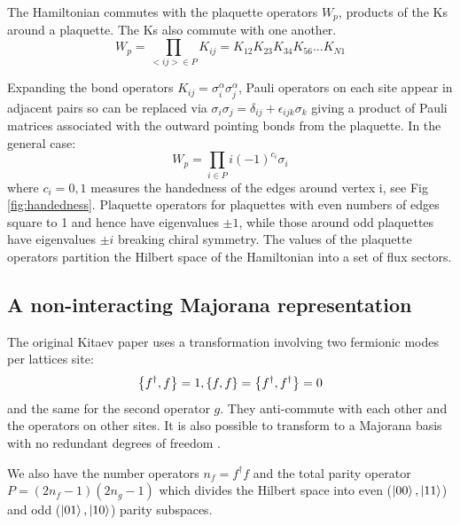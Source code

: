 The Hamiltonian commutes with the plaquette operators \(W_p\), products of the Ks around a plaquette. The Ks also commute with one another.
\[W_p = \prod_{<ij> \in P} K_{ij} = K_{12}K_{23}K_{34}K_{56} ... K_{N1}\]

Expanding the bond operators \(K_{ij} = \sigma_i^{\alpha} \sigma_j^{\alpha}\), Pauli operators on each site appear in adjacent pairs so can be replaced via \(\sigma_i \sigma_j = \delta_{ij} + \epsilon_{ijk} \sigma_k\) giving a product of Pauli matrices associated with the outward pointing bonds from the plaquette. In the general case:
\[W_p = \prod_{i \in P} i (-1)^{c_i} \sigma_i\]
where \(c_i = 0,1\) measures the handedness of the edges around vertex i, see Fig \ref{fig:handedness}. Plaquette operators for plaquettes with even numbers of edges square to 1 and hence have eigenvalues \(\pm 1\), while those around odd plaquettes have eigenvalues \(\pm i\) breaking chiral symmetry. The values of the plaquette operators partition the Hilbert space of the Hamiltonian into a set of flux sectors.



\subsection{A non-interacting Majorana representation}

The original Kitaev paper uses a transformation involving two fermionic modes per lattices site:
\[\acomm{f^\dagger}{f} = 1, \acomm{f}{f} = \acomm{f^\dagger}{f^\dagger} = 0\]
and the same for the second operator \(g\). They anti-commute with each other and the operators on other sites. It is also possible to transform to a Majorana basis with no redundant degrees of freedom \cite{fengTopologicalCharacterizationQuantum2007}.

We also have the number operators \(n_f = f^\dagger f\) and the total parity operator \(P = (2n_f - 1)(2n_g - 1)\) which divides the Hilbert space into even (\(\ket{00}, \ket{11}\)) and odd (\(\ket{01}, \ket{10}\)) parity subspaces. 

